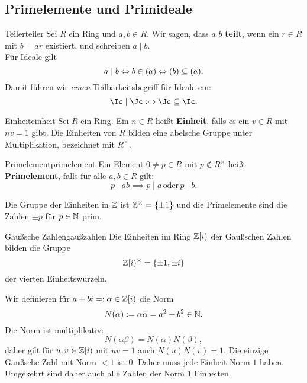 \subsection{Primelemente und Primideale}
\label{subsec:primelementeideale}
\begin{definition}{Teiler}{teiler}
Sei $R$ ein Ring und $a,b \in R$. Wir sagen, dass $a$ $b$ \textbf{teilt}, wenn ein $r \in R$ mit $b=ar$ existiert, und schreiben $a \mid b$.\\
Für Ideale gilt
\begin{equation}
a \mid b \iff b \in (a) \iff (b) \sub (a).
\end{equation}
Damit führen wir \textit{einen} Teilbarkeitsbegriff für Ideale ein:
\begin{equation}
\Ic \mid \Jc : \iff \Jc \sub \Ic.
\end{equation}
\end{definition}
\begin{definition}{Einheit}{einheit}
Sei $R$ ein Ring. Ein $n \in R$ heißt \textbf{Einheit}, falls es ein $v\in R$ mit $nv = 1$ gibt. Die Einheiten von $R$ bilden eine abelsche Gruppe unter Multiplikation, bezeichnet mit $R^\times$.
\end{definition}
\begin{definition}{Primelement}{primelement}
Ein Element $0 \neq p \in R$ mit $p \notin R^\times$ heißt \textbf{Primelement}, falls für alle $a,b \in R$ gilt:
\begin{equation}
p \mid ab \implies p \mid a \, \text{oder} \, p \mid b.
\end{equation}
\end{definition}
\begin{beispiel}
Die Gruppe der Einheiten in $\mathbb{Z}$ ist $\mathbb{Z}^\times = \{\pm 1\}$ und die Primelemente sind die Zahlen $\pm p$ für $p \in \mathbb{N}$ prim.
\end{beispiel}
\begin{satz}{Gaußsche Zahlen}{gaußzahlen}
Die Einheiten im Ring $\mathbb{Z}[i)$ der Gaußschen Zahlen bilden die Gruppe
\begin{equation}
\mathbb{Z}[i)^\times = \{\pm 1, \pm i\}
\end{equation}
der vierten Einheitswurzeln.
\end{satz}
\begin{beweis}
Wir definieren für $a+bi =:\alpha \in \mathbb{Z}[i)$ die Norm
\begin{equation}
N(\alpha) := \alpha \overline{\alpha} = a^2 + b^2 \in \mathbb{N}.
\end{equation}
Die Norm ist multiplikativ:
\begin{equation}
N(\alpha \beta)= N(\alpha) N(\beta),
\end{equation}
daher gilt für $u,v \in \mathbb{Z}[i)$ mit $uv=1$ auch $N(u)N(v)=1$. Die einzige Gaußsche Zahl mit Norm $<1$ ist $0$. Daher muss jede Einheit Norm $1$ haben. Umgekehrt sind daher auch alle Zahlen der Norm $1$ Einheiten.
\end{beweis}
